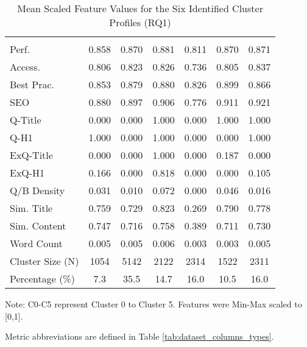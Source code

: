 \begin{table}[htbp!]
\centering
\caption{Mean Scaled Feature Values for the Six Identified Cluster Profiles (RQ1)}
\label{tab:rq1_cluster_summary}
\small 
\setlength{\tabcolsep}{3pt}
\renewcommand{\arraystretch}{1}
\begin{tabular*}{\textwidth}{l@{\extracolsep{\fill}} S[table-format=1.3] S[table-format=1.3] S[table-format=1.3] S[table-format=1.3] S[table-format=1.3] S[table-format=1.3] }
\toprule
{} & {{}} & {{}} & {{}} & {{}} & {{}} & {{}} \\
\dmidrule
Perf. & 0.858 & 0.870 & 0.881 & 0.811 & 0.870 & 0.871 \\
Access. & 0.806 & 0.823 & 0.826 & 0.736 & 0.805 & 0.837 \\
Best Prac. & 0.853 & 0.879 & 0.880 & 0.826 & 0.899 & 0.866 \\
SEO & 0.880 & 0.897 & 0.906 & 0.776 & 0.911 & 0.921 \\
Q-Title & 0.000 & 0.000 & 1.000 & 0.000 & 1.000 & 1.000 \\
Q-H1 & 1.000 & 0.000 & 1.000 & 0.000 & 0.000 & 1.000 \\
ExQ-Title & 0.000 & 0.000 & 1.000 & 0.000 & 0.187 & 0.000 \\
ExQ-H1 & 0.166 & 0.000 & 0.818 & 0.000 & 0.000 & 0.105 \\
Q/B Density & 0.031 & 0.010 & 0.072 & 0.000 & 0.046 & 0.016 \\
Sim. Title & 0.759 & 0.729 & 0.823 & 0.269 & 0.790 & 0.778 \\
Sim. Content & 0.747 & 0.716 & 0.758 & 0.389 & 0.711 & 0.730 \\
Word Count & 0.005 & 0.005 & 0.006 & 0.003 & 0.003 & 0.005 \\
\midrule
Cluster Size (N) & {1054} & {5142} & {2122} & {2314} & {1522} & {2311} \\
Percentage (\%) & {7.3} & {35.5} & {14.7} & {16.0} & {10.5} & {16.0} \\
\bottomrule
\end{tabular*}
\begin{tablenotes}[flushleft]
\scriptsize
\item Note: C0-C5 represent Cluster 0 to Cluster 5. Features were Min-Max scaled to [0,1].
\item Metric abbreviations are defined in Table \ref{tab:dataset_columns_types}.
\end{tablenotes}
\end{table}
